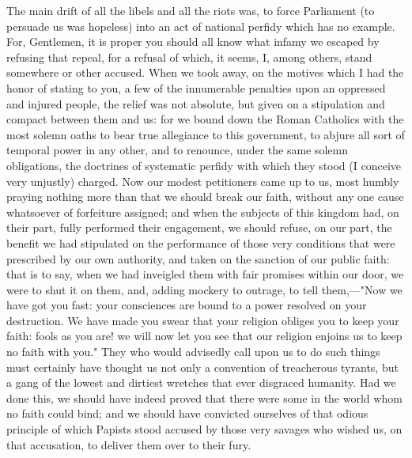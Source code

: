 The main drift of all the libels and all the riots was, to force Parliament (to persuade us was hopeless) into an act of national perfidy which has no example. For, Gentlemen, it is proper you should all know what infamy we escaped by refusing that repeal, for a refusal of which, it seems, I, among others, stand somewhere or other accused. When we took away, on the motives which I had the honor of stating to you, a few of the innumerable penalties upon an oppressed and injured people, the relief was not absolute, but given on a stipulation and compact between them and us: for we bound down the Roman Catholics with the most solemn oaths to bear true allegiance to this government, to abjure all sort of temporal power in any other, and to renounce, under the same solemn obligations, the doctrines of systematic perfidy with which they stood (I conceive very unjustly) charged. Now our modest petitioners came up to us, most humbly praying nothing more than that we should break our faith, without any one cause whatsoever of forfeiture assigned; and when the subjects of this kingdom had, on their part, fully performed their engagement, we should refuse, on our part, the benefit we had stipulated on the performance of those very conditions that were prescribed by our own authority, and taken on the sanction of our public faith: that is to say, when we had inveigled them with fair promises within our door, we were to shut it on them, and, adding mockery to outrage, to tell them,—"Now we have got you fast: your consciences are bound to a power resolved on your destruction. We have made you swear that your religion obliges you to keep your faith: fools as you are! we will now let you see that our religion enjoins us to keep no faith with you." They who would advisedly call upon us to do such things must certainly have thought us not only a convention of treacherous tyrants, but a gang of the lowest and dirtiest wretches that ever disgraced humanity. Had we done this, we should have indeed proved that there were some in the world whom no faith could bind; and we should have convicted ourselves of that odious principle of which Papists stood accused by those very savages who wished us, on that accusation, to deliver them over to their fury.

